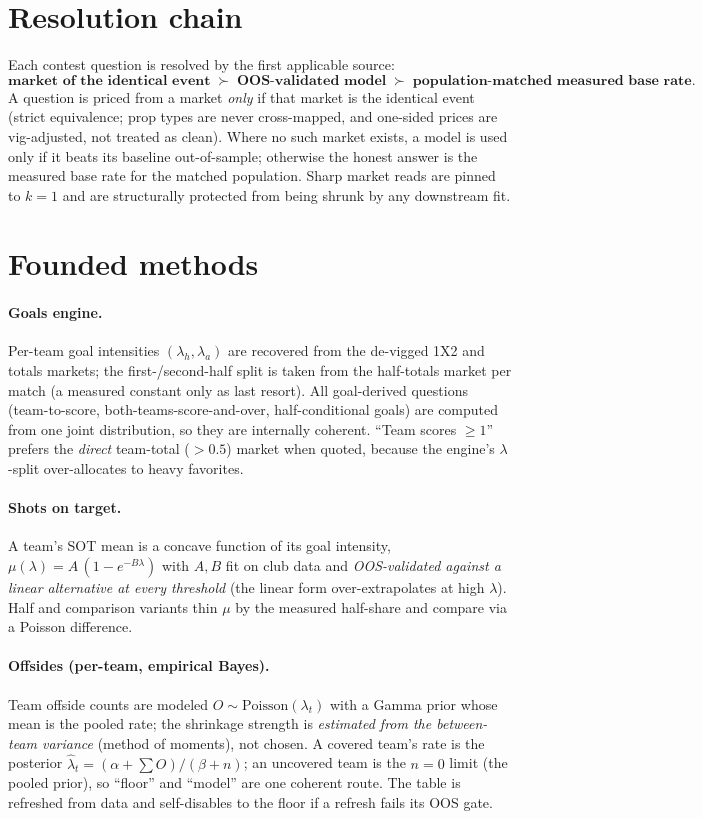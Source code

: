 \documentclass[11pt]{article}
\begin{document}
\section{Resolution chain}
Each contest question is resolved by the first applicable source:
\[
\textbf{market of the identical event} \;\succ\; \textbf{OOS-validated model} \;\succ\;
\textbf{population-matched measured base rate}.
\]
A question is priced from a market \emph{only} if that market is the identical event (strict
equivalence; prop types are never cross-mapped, and one-sided prices are vig-adjusted, not treated
as clean). Where no such market exists, a model is used only if it beats its baseline
out-of-sample; otherwise the honest answer is the measured base rate for the matched population.
Sharp market reads are pinned to $k=1$ and are structurally protected from being shrunk by any
downstream fit.

\section{Founded methods}
\paragraph{Goals engine.} Per-team goal intensities $(\lambda_h,\lambda_a)$ are recovered from the
de-vigged 1X2 and totals markets; the first-/second-half split is taken from the half-totals market
per match (a measured constant only as last resort). All goal-derived questions (team-to-score,
both-teams-score-and-over, half-conditional goals) are computed from one joint distribution, so they
are internally coherent. ``Team scores $\ge 1$'' prefers the \emph{direct} team-total ($>0.5$)
market when quoted, because the engine's $\lambda$-split over-allocates to heavy favorites.

\paragraph{Shots on target.} A team's SOT mean is a concave function of its goal intensity,
$\mu(\lambda)=A\,(1-e^{-B\lambda})$ with $A,B$ fit on club data and \emph{OOS-validated against a
linear alternative at every threshold} (the linear form over-extrapolates at high $\lambda$). Half
and comparison variants thin $\mu$ by the measured half-share and compare via a Poisson difference.

\paragraph{Offsides (per-team, empirical Bayes).} Team offside counts are modeled
$O\sim\mathrm{Poisson}(\lambda_t)$ with a Gamma prior whose mean is the pooled rate; the shrinkage
strength is \emph{estimated from the between-team variance} (method of moments), not chosen. A
covered team's rate is the posterior $\hat\lambda_t=(\alpha+\sum O)/(\beta+n)$; an uncovered team
is the $n{=}0$ limit (the pooled prior), so ``floor'' and ``model'' are one coherent route. The
table is refreshed from data and self-disables to the floor if a refresh fails its OOS gate.
\end{document}

